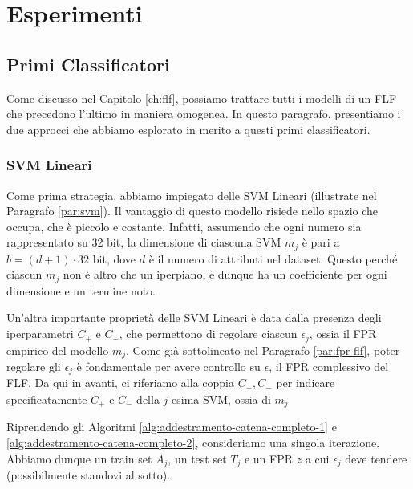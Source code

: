\chapter{Esperimenti}

\section{Primi Classificatori}
\label{par:primi-classificatori}
Come discusso nel Capitolo \ref{ch:flf}, possiamo trattare tutti i modelli di un FLF che precedono l'ultimo in maniera omogenea. In questo paragrafo, presentiamo i due approcci che abbiamo esplorato in merito a questi primi classificatori.






\subsection{SVM Lineari}
\label{par:exp-svm}
Come prima strategia, abbiamo impiegato delle SVM Lineari (illustrate nel Paragrafo \ref{par:svm}). Il vantaggio di questo modello risiede nello spazio che occupa, che è piccolo e costante. Infatti, assumendo che ogni numero sia rappresentato su 32 bit, la dimensione di ciascuna SVM $m_j$ è pari a $b = (d+1) \cdot 32$ bit, dove $d$ è il numero di attributi nel dataset. Questo perché ciascun $m_j$ non è altro che un iperpiano, e dunque ha un coefficiente per ogni dimensione e un termine noto.

Un'altra importante proprietà delle SVM Lineari è data dalla presenza degli iperparametri $C_+$ e $C_-$, che permettono di regolare ciascun $\epsilon_j$, ossia il FPR empirico del modello $m_j$. Come già sottolineato nel Paragrafo \ref{par:fpr-flf}, poter regolare gli $\epsilon_j$ è fondamentale per avere controllo su $\epsilon$, il FPR complessivo del FLF. Da qui in avanti, ci riferiamo alla coppia $C_+, C_-$ per indicare specificatamente $C_+$ e $C_-$ della $j$-esima SVM, ossia di $m_j$

Riprendendo gli Algoritmi \ref{alg:addestramento-catena-completo-1} e \ref{alg:addestramento-catena-completo-2}, consideriamo una singola iterazione. Abbiamo dunque un train set $A_j$, un test set $T_j$ e un FPR $z$ a cui $\epsilon_j$ deve tendere (possibilmente standovi al sotto). 

